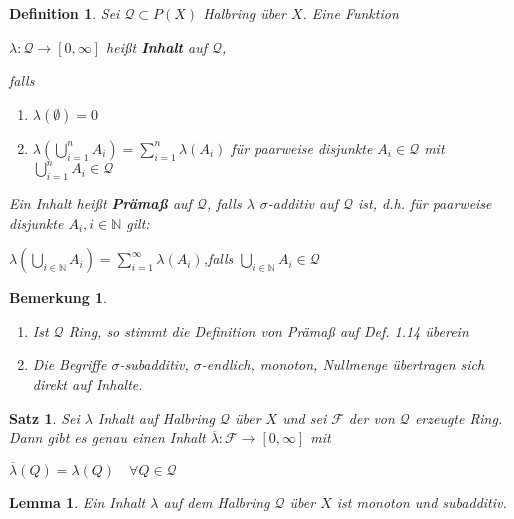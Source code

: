 \documentclass[11pt]{memoir}
\theoremstyle{changebreak}
\newtheorem{Definition}{Definition}[chapter]
\newtheorem{Bemerkung}{Bemerkung}[chapter]
\newtheorem{Lemma}{Lemma}[chapter]
\newtheorem{Satz}{Satz}[chapter]
\begin{document}
\begin{Definition}
Sei $\mathscr Q \subset P(X)$ Halbring über $X$. Eine Funktion 
\begin{center}
	$\lambda: \mathscr Q \rightarrow [0, \infty ]$ heißt \textbf{Inhalt} auf $\mathscr Q$, 
\end{center}	
falls
\begin{enumerate}
	\item $\lambda(\emptyset) = 0$
	\item $\lambda\left(\bigcup\limits_{i=1}^n	A_i\right) = \sum\limits_{i=1}^n \lambda(A_i)$ für paarweise disjunkte $A_i \in \mathscr Q$ mit $\bigcup\limits_{i=1}^n A_i \in \mathscr Q$
\end{enumerate}

Ein Inhalt heißt \textbf{Prämaß} auf $\mathscr Q$, falls $\lambda$ $\sigma$-additiv auf $\mathscr Q$ ist, d.h. für paarweise disjunkte $A_i, i \in \mathbb N$ gilt: 
\begin{center}
	$\lambda\left(\bigcup\limits_{i\in \mathbb N} A_i \right) = \sum\limits_{i=1}^\infty \lambda(A_i)$,\quad  falls $\bigcup\limits_{i \in \mathbb N} A_i \in \mathscr Q$
\end{center}	
\end{Definition}

\begin{Bemerkung}
\begin{enumerate}
	\item Ist $\mathscr Q$ Ring, so stimmt die Definition von Prämaß auf \emph{Def. 1.14} überein
	\item Die Begriffe $\sigma$-subadditiv, $\sigma$-endlich, monoton, Nullmenge übertragen sich direkt auf Inhalte.
\end{enumerate}
\end{Bemerkung}

\begin{Satz}
Sei $\lambda$ Inhalt auf Halbring $\mathscr Q$ über $X$ und sei $\mathscr F$ der von $\mathscr Q$ erzeugte Ring. Dann gibt es genau einen Inhalt $\overline{\lambda}: \mathscr F \rightarrow [0, \infty]$ mit 
\begin{center}
	$\overline{\lambda}(Q) = \lambda(Q)\quad \forall Q \in \mathscr Q$
\end{center}
\end{Satz}


\begin{Lemma}
Ein Inhalt $\lambda$ auf dem Halbring $\mathscr Q$ über $X$ ist monoton und subadditiv.
\end{Lemma}
\end{document}
